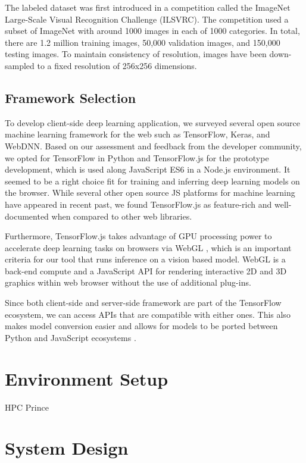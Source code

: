 The labeled dataset was first introduced in a competition called the ImageNet Large-Scale Visual Recognition Challenge (ILSVRC). The competition used a subset of ImageNet with around 1000 images in each of 1000 categories. In total, there are 1.2 million training images, 50,000 validation images, and 150,000 testing images. To maintain consistency of resolution, images have been down-sampled to a fixed resolution of 256x256 dimensions.
    
\subsection{Framework Selection}

To develop client-side deep learning application, we surveyed several open source machine learning framework for the web such as TensorFlow, Keras, and WebDNN. Based on our assessment and feedback from the developer community, we opted for TensorFlow in Python and TensorFlow.js for the prototype development, which is used along JavaScript ES6 in a Node.js environment. It seemed to be a right choice fit for training and inferring deep learning models on the browser. While several other open source JS platforms for machine learning have appeared in recent past, we found TensorFlow.js as feature-rich and well-documented when compared to other web libraries.

Furthermore, TensorFlow.js takes advantage of GPU processing power to accelerate deep learning tasks on browsers via WebGL \cite{Ma2019}, which is an important criteria for our tool that runs inference on a vision based model. WebGL is a back-end compute and a JavaScript API for rendering interactive 2D and 3D graphics within web browser without the use of additional plug-ins.

Since both client-side and server-side framework are part of the TensorFlow ecosystem, we can access APIs that are compatible with either ones. This also makes model conversion easier and allows for models to be ported between Python and JavaScript ecosystems \cite{Smilkov2019}.

\section{Environment Setup}
HPC Prince

\section{System Design}

